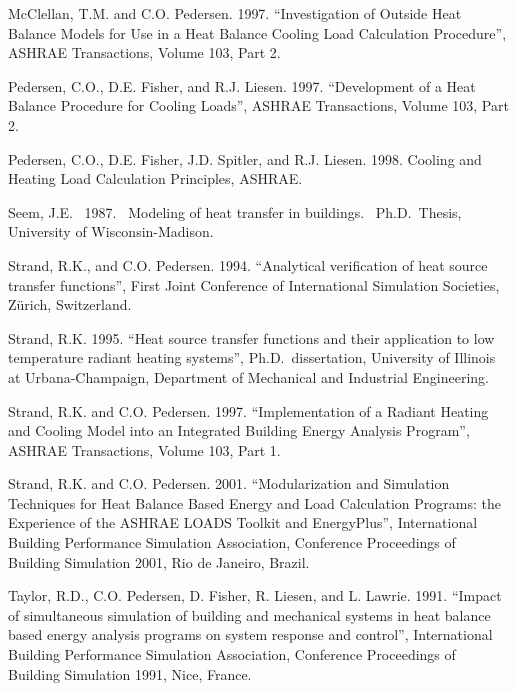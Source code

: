 McClellan, T.M. and C.O. Pedersen. 1997. ``Investigation of Outside Heat Balance Models for Use in a Heat Balance Cooling Load Calculation Procedure'', ASHRAE Transactions, Volume 103, Part 2.

Pedersen, C.O., D.E. Fisher, and R.J. Liesen. 1997. ``Development of a Heat Balance Procedure for Cooling Loads'', ASHRAE Transactions, Volume 103, Part 2.

Pedersen, C.O., D.E. Fisher, J.D. Spitler, and R.J. Liesen. 1998. Cooling and Heating Load Calculation Principles, ASHRAE.

Seem, J.E.~ 1987. ~Modeling of heat transfer in buildings.~ Ph.D.~Thesis, University of Wisconsin-Madison.

Strand, R.K., and C.O. Pedersen. 1994. ``Analytical verification of heat source transfer functions'', First Joint Conference of International Simulation Societies, Zürich, Switzerland.

Strand, R.K. 1995. ``Heat source transfer functions and their application to low temperature radiant heating systems'', Ph.D.~dissertation, University of Illinois at Urbana-Champaign, Department of Mechanical and Industrial Engineering.

Strand, R.K. and C.O. Pedersen. 1997. ``Implementation of a Radiant Heating and Cooling Model into an Integrated Building Energy Analysis Program'', ASHRAE Transactions, Volume 103, Part 1.

Strand, R.K. and C.O. Pedersen. 2001. ``Modularization and Simulation Techniques for Heat Balance Based Energy and Load Calculation Programs: the Experience of the ASHRAE LOADS Toolkit and EnergyPlus'', International Building Performance Simulation Association, Conference Proceedings of Building Simulation 2001, Rio de Janeiro, Brazil.

Taylor, R.D., C.O. Pedersen, D. Fisher, R. Liesen, and L. Lawrie. 1991. ``Impact of simultaneous simulation of building and mechanical systems in heat balance based energy analysis programs on system response and control'', International Building Performance Simulation Association, Conference Proceedings of Building Simulation 1991, Nice, France.
